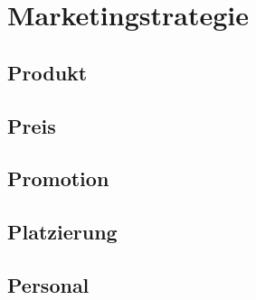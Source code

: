 \section{Marketingstrategie}

\subsection{Produkt}

\subsection{Preis}

\subsection{Promotion}

\subsection{Platzierung}

\subsection{Personal}